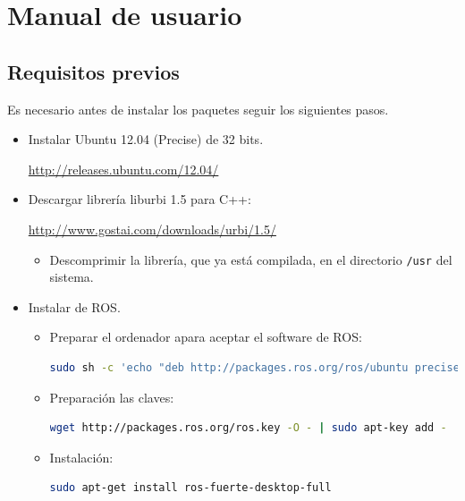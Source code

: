\documentclass[12pt,a4paper,final,twoside]{book}
\begin{document}
\label{Referencies}
%

\appendix
\clearpage %
\addappheadtotoc

\chapter{Manual de usuario}\label{MU}
\thispagestyle{fancy}
\section{Requisitos previos}
Es necesario antes de instalar los paquetes seguir los siguientes pasos.

\begin{itemize}
\item Instalar Ubuntu 12.04 (Precise) de 32 bits.

\url{http://releases.ubuntu.com/12.04/}

\item Descargar librería liburbi 1.5 para C++:

\url{http://www.gostai.com/downloads/urbi/1.5/}
\begin{itemize}
\item Descomprimir la librería, que ya está compilada, en el directorio \texttt{/usr} del sistema.
\end{itemize}
\item Instalar de ROS. 

\begin{itemize}
\item Preparar el ordenador apara aceptar el software de ROS:


\begin{lstlisting}[language=bash]
  sudo sh -c 'echo "deb http://packages.ros.org/ros/ubuntu precise main" > /etc/apt/sources.list.d/ros-latest.list'
\end{lstlisting}

\item Preparación las claves:
\begin{lstlisting}[language=bash]
	wget http://packages.ros.org/ros.key -O - | sudo apt-key add -
\end{lstlisting}

\item Instalación:
\begin{lstlisting}[language=bash]
	sudo apt-get install ros-fuerte-desktop-full
\end{lstlisting}


\end{itemize}
\end{itemize}
\end{document}
